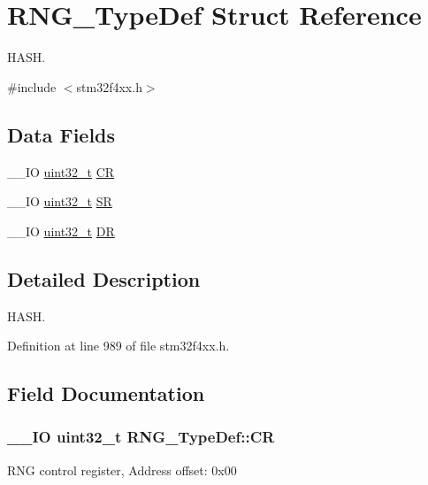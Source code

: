 \hypertarget{struct_r_n_g___type_def}{\section{R\-N\-G\-\_\-\-Type\-Def Struct Reference}
\label{struct_r_n_g___type_def}
}


H\-A\-S\-H.  




{\ttfamily \#include $<$stm32f4xx.\-h$>$}

\subsection*{Data Fields}
\begin{DoxyCompactItemize}
\item 
\-\_\-\-\_\-\-I\-O \hyperlink{stdint_8h_a435d1572bf3f880d55459d9805097f62}{uint32\-\_\-t} \hyperlink{struct_r_n_g___type_def_ab422a7aeea33d29d0f8b841bb461e3a8}{C\-R}
\item 
\-\_\-\-\_\-\-I\-O \hyperlink{stdint_8h_a435d1572bf3f880d55459d9805097f62}{uint32\-\_\-t} \hyperlink{struct_r_n_g___type_def_a4e4c38cd6a078fea5f9fa5e31bc0d326}{S\-R}
\item 
\-\_\-\-\_\-\-I\-O \hyperlink{stdint_8h_a435d1572bf3f880d55459d9805097f62}{uint32\-\_\-t} \hyperlink{struct_r_n_g___type_def_a89f3352fb11cca430aaecc0c9b49c6d3}{D\-R}
\end{DoxyCompactItemize}


\subsection{Detailed Description}
H\-A\-S\-H. 

Definition at line 989 of file stm32f4xx.\-h.



\subsection{Field Documentation}
\hypertarget{struct_r_n_g___type_def_ab422a7aeea33d29d0f8b841bb461e3a8}{
\subsubsection[{C\-R}]{\setlength{\rightskip}{0pt plus 5cm}\-\_\-\-\_\-\-I\-O {\bf uint32\-\_\-t} R\-N\-G\-\_\-\-Type\-Def\-::\-C\-R}}\label{struct_r_n_g___type_def_ab422a7aeea33d29d0f8b841bb461e3a8}
R\-N\-G control register, Address offset\-: 0x00 

